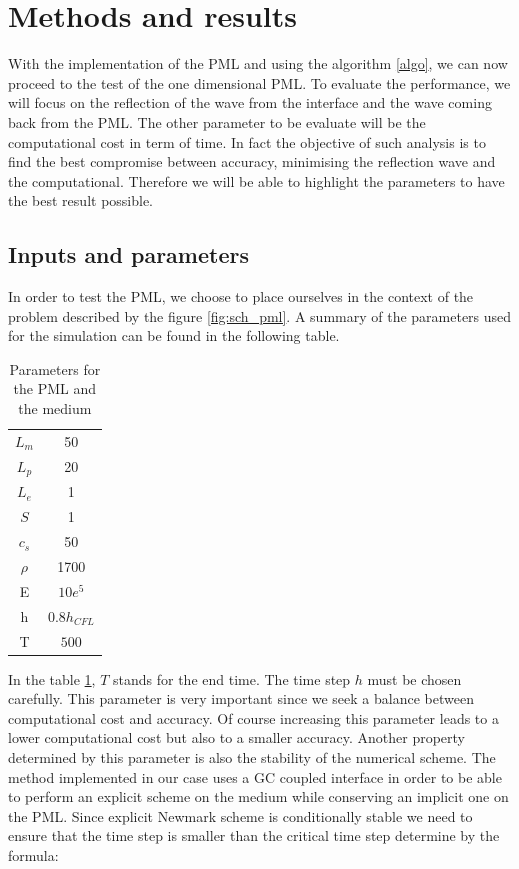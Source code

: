 \section{Methods and results}
With the implementation of the PML and using the algorithm \ref{algo}, we can now proceed to the test of the one dimensional PML. To evaluate the performance, we will focus on the reflection of the wave from the interface and the wave coming back from the PML. The other parameter to be evaluate will be the computational cost in term of time. In fact the objective of such analysis is to find the best compromise between accuracy, minimising the reflection wave and the computational. Therefore we will be able to highlight the parameters to have the best result possible.
\subsection{Inputs and parameters}
In order to test the PML, we choose to place ourselves in the context of the problem described by the figure \ref{fig:sch_pml}. A summary of the parameters used for the simulation can be found in the following table.
\begin{table}[H]
    \centering
    \begin{tabular}{c|c}
         $L_m$ & 50  \\
         $L_p$ & 20 \\
         $L_e$ & 1 \\
         $S$ & 1 \\
         $c_s$ & 50 \\
         $\rho$ & 1700\\
         E & $10e^5$ \\
         h & $0.8 h_{CFL}$ \\
         T & $500$ \\
    \end{tabular}
    \caption{Parameters for the PML and the medium}
    \label{tab:param}
\end{table}
In the table \ref{tab:param}, $T$ stands for the end time. The time step $h$ must be chosen carefully. This parameter is very important since we seek a balance between computational cost and accuracy. Of course increasing this parameter leads to a lower computational cost but also to a smaller accuracy. Another property determined by this parameter is also the stability of the numerical scheme. The method implemented in our case uses a GC coupled interface in order to be able to perform an explicit scheme on the medium while conserving an implicit one on the PML. Since explicit Newmark scheme is conditionally stable we need to ensure that the time step is smaller than the critical time step determine by the formula:
